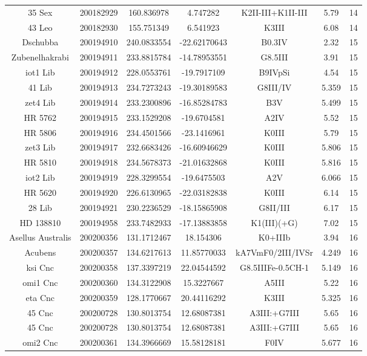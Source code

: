 \begin{table*}
\begin{tabular}{ccccccc}
35 Sex & 200182929 & 160.836978 & 4.747282 & K2II-III+K1II-III & 5.79 & 14 \\
43 Leo & 200182930 & 155.751349 & 6.541923 & K3III & 6.08 & 14 \\
Dschubba & 200194910 & 240.0833554 & -22.62170643 & B0.3IV & 2.32 & 15 \\
Zubenelhakrabi & 200194911 & 233.8815784 & -14.78953551 & G8.5III & 3.91 & 15 \\
iot1 Lib & 200194912 & 228.0553761 & -19.7917109 & B9IVpSi & 4.54 & 15 \\
41 Lib & 200194913 & 234.7273243 & -19.30189583 & G8III/IV & 5.359 & 15 \\
zet4 Lib & 200194914 & 233.2300896 & -16.85284783 & B3V & 5.499 & 15 \\
HR 5762 & 200194915 & 233.1529208 & -19.6704581 & A2IV & 5.52 & 15 \\
HR 5806 & 200194916 & 234.4501566 & -23.1416961 & K0III & 5.79 & 15 \\
zet3 Lib & 200194917 & 232.6683426 & -16.60946629 & K0III & 5.806 & 15 \\
HR 5810 & 200194918 & 234.5678373 & -21.01632868 & K0III & 5.816 & 15 \\
iot2 Lib & 200194919 & 228.3299554 & -19.6475503 & A2V & 6.066 & 15 \\
HR 5620 & 200194920 & 226.6130965 & -22.03182838 & K0III & 6.14 & 15 \\
28 Lib & 200194921 & 230.2236529 & -18.15865908 & G8II/III & 6.17 & 15 \\
HD 138810 & 200194958 & 233.7482933 & -17.13883858 & K1(III)(+G) & 7.02 & 15 \\
Asellus Australis & 200200356 & 131.1712467 & 18.154306 & K0+IIIb & 3.94 & 16 \\
Acubens & 200200357 & 134.6217613 & 11.85770033 & kA7VmF0/2III/IVSr & 4.249 & 16 \\
ksi Cnc & 200200358 & 137.3397219 & 22.04544592 & G8.5IIIFe-0.5CH-1 & 5.149 & 16 \\
omi1 Cnc & 200200360 & 134.3122908 & 15.3227667 & A5III & 5.22 & 16 \\
eta Cnc & 200200359 & 128.1770667 & 20.44116292 & K3III & 5.325 & 16 \\
45 Cnc & 200200728 & 130.8013754 & 12.68087381 & A3III:+G7III & 5.65 & 16 \\
45 Cnc & 200200728 & 130.8013754 & 12.68087381 & A3III:+G7III & 5.65 & 16 \\
omi2 Cnc & 200200361 & 134.3966669 & 15.58128181 & F0IV & 5.677 & 16 \\

\end{tabular}
\end{table*}
